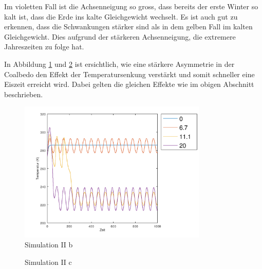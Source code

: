 \begin{refsection}
Im violetten Fall ist die Achsenneigung so gross, dass bereits der erste Winter so kalt ist, dass die Erde ins kalte Gleichgewicht wechselt. Es ist auch gut zu erkennen, dass die Schwankungen stärker sind als in dem gelben Fall im kalten Gleichgewicht. Dies aufgrund der stärkeren Achsenneigung, die extremere Jahreszeiten zu folge hat. 

In Abbildung \ref{fig:abb13} und \ref{fig:abb14} ist ersichtlich, wie eine stärkere Asymmetrie in der Coalbedo den Effekt der Temperatursenkung verstärkt und somit schneller eine Eiszeit erreicht wird. Dabei gelten die gleichen Effekte wie im obigen Abschnitt beschrieben. 
%
\begin{figure}
	\centering
	\includegraphics[width= 0.8\textwidth]{neigung/Zeitachse_2.png}
	\caption[Simulation II b]{Simulation II b}
	\label{fig:abb13}
\end{figure}
%
%
\begin{figure}
	\centering
	\caption[Simulation II c]{Simulation II c}
	\label{fig:abb14}
\end{figure}
%


\end{refsection}
